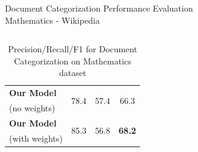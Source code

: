 \documentclass[10pt]{beamer}
\newcommand{\highest}[1]{\textbf{#1}}
\begin{document}
\begin{frame}{Document Categorization Performance Evaluation \\ Mathematics - Wikipedia }
\begin{columns}[T]
\begin{column}{.4\textwidth}
\begin{table}[h!]
\begin{center}
\begin{tabular}{l@{\hskip3mm} c c@{\hskip4mm} c}
	\textbf{Our Model}
	& \multirow{2}{*}{78.4}   & \multirow{2}{*}{57.4}  & \multirow{2}{*}{66.3} \\
	(no weights) & & & \\ \addlinespace[1mm]
	\textbf{Our Model}
	& \multirow{2}{*}{85.3}   & \multirow{2}{*}{56.8}  & \multirow{2}{*}{\highest{68.2}} \\
	(with weights) & & & \\
	\bottomrule         
	\end{tabular}
	\caption*{\footnotesize Precision/Recall/F1 for Document Categorization on Mathematics dataset}
	\end{center}
	\end{table}
	\end{column}
\end{columns}

\end{frame}

\end{document}
